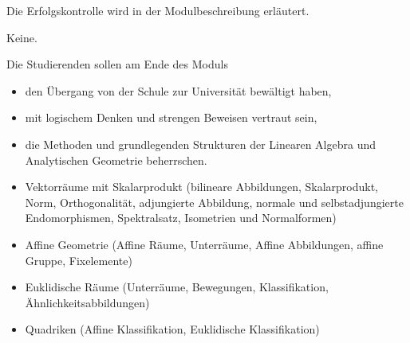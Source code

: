 \begin{course}

\setdoclanguagegerman
{}



\coursehead


\label{cour_7567.dp_997}


\begin{styleenv}
\begin{assessment}
Die Erfolgskontrolle wird in der Modulbeschreibung erläutert.


\end{assessment}

\begin{conditions}Keine.\end{conditions}


\end{styleenv}

\begin{learningoutcomes}
Die Studierenden sollen am Ende des Moduls

 \begin{itemize}\item den Übergang von der Schule zur Universität bewältigt haben,  \item mit logischem Denken und strengen Beweisen vertraut sein,   \item die Methoden und grundlegenden Strukturen der Linearen Algebra und Analytischen Geometrie beherrschen.  \end{itemize}
\end{learningoutcomes}

\begin{content}
\begin{itemize}\item Vektorräume mit Skalarprodukt (bilineare Abbildungen, Skalarprodukt, Norm, Orthogonalität, adjungierte Abbildung, normale und selbstadjungierte Endomorphismen, Spektralsatz, Isometrien und Normalformen)  \item Affine Geometrie (Affine Räume, Unterräume, Affine Abbildungen, affine Gruppe, Fixelemente)  \item Euklidische Räume (Unterräume, Bewegungen, Klassifikation, Ähnlichkeitsabbildungen)  \item Quadriken (Affine Klassifikation, Euklidische Klassifikation)  \end{itemize}
\end{content}




\end{course}
